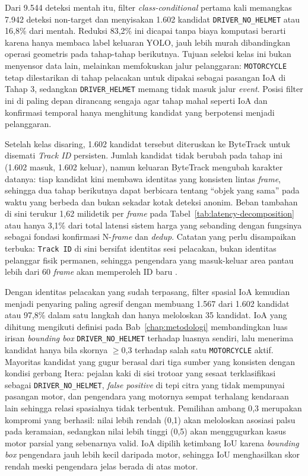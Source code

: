 Dari 9.544 deteksi mentah itu, filter \textit{class-conditional} pertama kali memangkas 7.942 deteksi non-target dan menyisakan 1.602 kandidat \texttt{DRIVER\_NO\_HELMET} atau 16,8\% dari mentah. Reduksi 83,2\% ini dicapai tanpa biaya komputasi berarti karena hanya membaca label keluaran YOLO, jauh lebih murah dibandingkan operasi geometris pada tahap-tahap berikutnya. Tujuan seleksi kelas ini bukan menyensor data lain, melainkan memfokuskan jalur pelanggaran: \texttt{MOTORCYCLE} tetap dilestarikan di tahap pelacakan untuk dipakai sebagai pasangan IoA di Tahap 3, sedangkan \texttt{DRIVER\_HELMET} memang tidak masuk jalur \textit{event}. Posisi filter ini di paling depan dirancang sengaja agar tahap mahal seperti IoA dan konfirmasi temporal hanya menghitung kandidat yang berpotensi menjadi pelanggaran.

Setelah kelas disaring, 1.602 kandidat tersebut diteruskan ke ByteTrack untuk disemati \textit{Track ID} persisten. Jumlah kandidat tidak berubah pada tahap ini (1.602 masuk, 1.602 keluar), namun keluaran ByteTrack mengubah karakter datanya: tiap kandidat kini membawa identitas yang konsisten lintas \textit{frame}, sehingga dua tahap berikutnya dapat berbicara tentang ``objek yang sama'' pada waktu yang berbeda dan bukan sekadar kotak deteksi anonim. Beban tambahan di sini terukur 1,62 milidetik per \textit{frame} pada Tabel~\ref{tab:latency-decomposition} atau hanya 3,1\% dari total latensi sistem harga yang sebanding dengan fungsinya sebagai fondasi konfirmasi N-\textit{frame} dan \textit{dedup}. Catatan yang perlu disampaikan terbuka: \texttt{Track ID} di sini bersifat identitas sesi pelacakan, bukan identitas pelanggar fisik permanen, sehingga pengendara yang masuk-keluar area pantau lebih dari 60 \textit{frame} akan memperoleh ID baru \cite{zhang2022bytetrack_eccv}.

Dengan identitas pelacakan yang sudah terpasang, filter spasial IoA kemudian menjadi penyaring paling agresif dengan membuang 1.567 dari 1.602 kandidat atau 97,8\% dalam satu langkah dan hanya meloloskan 35 kandidat. IoA yang dihitung mengikuti definisi pada Bab~\ref{chap:metodologi} membandingkan luas irisan \textit{bounding box} \texttt{DRIVER\_NO\_HELMET} terhadap luasnya sendiri, lalu menerima kandidat hanya bila skornya $\geq$0{,}3 terhadap salah satu \texttt{MOTORCYCLE} aktif. Mayoritas kandidat yang gugur berasal dari tiga sumber yang konsisten dengan kondisi gerbang Itera: pejalan kaki di sisi trotoar yang sesaat terklasifikasi sebagai \texttt{DRIVER\_NO\_HELMET}, \textit{false positive} di tepi citra yang tidak mempunyai pasangan motor, dan pengendara yang motornya sempat terhalang kendaraan lain sehingga relasi spasialnya tidak terbentuk. Pemilihan ambang 0{,}3 merupakan kompromi yang berhasil: nilai lebih rendah (0{,}1) akan meloloskan asosiasi palsu pada keramaian, sedangkan nilai lebih tinggi (0{,}5) akan menggugurkan kasus motor parsial yang sebenarnya valid. IoA dipilih ketimbang IoU karena \textit{bounding box} pengendara jauh lebih kecil daripada motor, sehingga IoU menghasilkan skor rendah meski pengendara jelas berada di atas motor.

